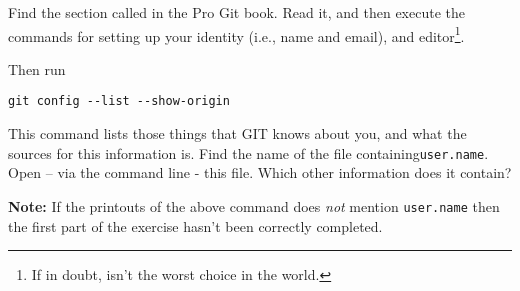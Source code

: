 Find the section called  in the Pro Git book\cite{chacon2014pro}. Read it, and then execute the commands for setting up your identity (i.e., name and email), and editor\footnote{If in doubt,  isn't the worst choice in the world.}.

Then run
\begin{verbatim}
git config --list --show-origin
\end{verbatim}

This command lists those things that GIT knows about you, and what the sources for this information is. Find the name of the file containing\texttt{user.name}. Open -- via the command line - this file. Which other information does it contain?

\textbf{Note:} If the printouts of the above command does \textsl{not} mention \texttt{user.name} then the first part of the exercise hasn't been correctly completed.

